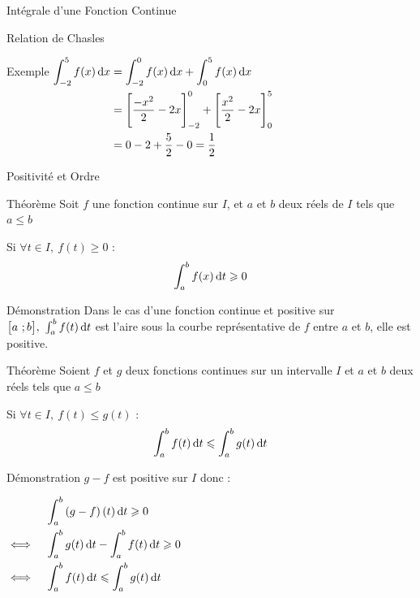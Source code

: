 \documentclass{coursbook}
\begin{document}
\begin{Gpartie}{Intégrale d'une Fonction Continue}
\begin{Spartie}{Relation de Chasles}
\begin{SSpartie}{Exemple}
                $\begin{aligned}[t]
                    \int_{-2}^5f(x)\dx &= \int_{-2}^0f(x)\dx+\int_0^5f(x)\dx \\
                    &= \Bigg[\frac{-x^2}{2}-2x\Bigg]_{-2}^0+\Bigg[\frac{x^2}{2}-2x\Bigg]_0^5 \\
                    &= 0-2+\frac{5}{2}-0=\frac{1}{2} 
                \end{aligned}$
            \end{SSpartie}
        \end{Spartie}
        \begin{Spartie}{Positivité et Ordre} 
            \begin{SSpartie}{Théorème} 
                Soit $f$ une fonction continue sur $I$, et $a$ et $b$ deux réels de $I$ tels que $a\leq b$

                Si $\forall t\in I,~f(t)\geq0$ : \[\int_a^b f(x)\,\mathrm{d}t\geqslant0\]
                \begin{SSSpartie}{Démonstration} 
                    Dans le cas d'une fonction continue et positive sur $\big[a~;b\big],~\int_a^b f(t)\,\mathrm{d}t$ est l'aire sous la courbe représentative de $f$ entre $a$ et $b$, elle est positive.
                \end{SSSpartie}
            \end{SSpartie}
            \begin{SSpartie}{Théorème} 
                Soient $f$ et $g$ deux fonctions continues sur un intervalle $I$ et $a$ et $b$ deux réels tels que $a\leq b$

                Si $\forall t\in I,~f(t)\leq g(t)$ : \[\int_a^b f(t)\,\mathrm{d}t\leqslant\int_a^bg(t)\,\mathrm{d}t\]
                \begin{SSSpartie}{Démonstration} 
                    $g-f$ est positive sur $I$ donc : 

                    $\begin{aligned}[t]
                        &\quad\int_a^b\left(g-f\right)(t)\,\mathrm{d}t\geqslant 0 \\
                        \iff&\quad\int_a^b g(t)\,\mathrm{d}t-\int_a^b f(t)\,\mathrm{d}t\geqslant 0 \\
                        \iff&\quad\int_a^b f(t)\,\mathrm{d}t\leqslant\int_a^b g(t)\,\mathrm{d}t
                    \end{aligned}$
                \end{SSSpartie}
            \end{SSpartie}
        \end{Spartie}
    \end{Gpartie}
\end{document}
